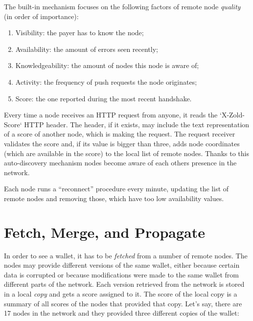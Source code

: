 \documentclass{main}
\begin{document}
The built-in mechanism focuses on the following factors of
remote node \emph{quality} (in order of importance):

\begin{enumerate}
  \item Visibility: the payer has to know the node;
  \item Availability: the amount of errors seen recently;
  \item Knowledgeability: the amount of nodes this node is aware of;
  \item Activity: the frequency of push requests the node originates;
  \item Score: the one reported during the most recent handshake.
\end{enumerate}

Every time a node receives an HTTP request from anyone, it reads the
`X-Zold-Score` HTTP header. The header, if it exists, may include
the text representation of a score of another node, which is making
the request. The request receiver validates the score and, if its
value is bigger than three, adds node coordinates (which are
available in the score) to the local list of remote nodes. Thanks to this
auto-discovery mechanism nodes become aware of each others presence
in the network.

Each node runs a ``reconnect'' procedure every minute, updating the list
of remote nodes and removing those, which have too low availability values.

\section{Fetch, Merge, and Propagate}\label{sec:fetch}

In order to see a wallet, it has to be \emph{fetched} from a number of remote
nodes. The nodes may provide different versions of the same wallet, either
because certain data is corrupted or because modifications were made to the same
wallet from different parts of the network. Each version retrieved from the
network is stored in a local \emph{copy} and gets a score assigned to it.
The score of the local copy is a summary of all scores of the nodes that
provided that copy. Let's say, there are 17 nodes in the network and they
provided three different copies of the wallet:
\end{document}
